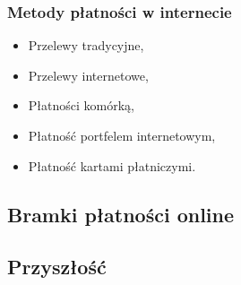 \subsubsection*{Metody płatności w internecie}
\begin{itemize}
	\renewcommand{\labelitemi}{--}
	\item Przelewy tradycyjne,
	\item Przelewy internetowe,
	\item Płatności komórką,
	\item Płatność portfelem internetowym,
	\item Płatność kartami płatniczymi.
\end{itemize}


\subsection{Bramki płatności online}


\subsection{Przyszłość}

